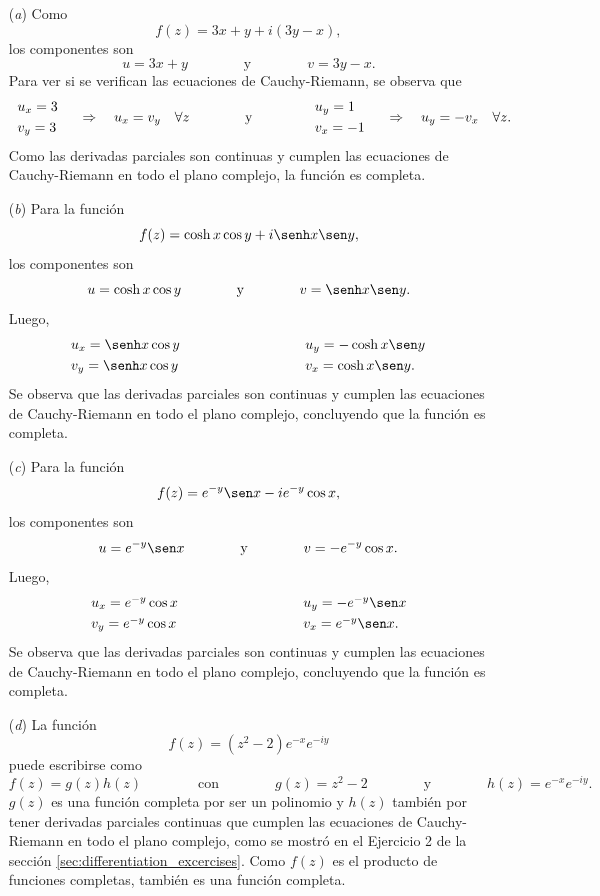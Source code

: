 \documentclass[a4paper]{report}
\begin{document}
\begin{enumerate}
 \item[(\textit{a})] Como
 \[
  f(z)=3x+y+i(3y-x),
 \]
 los componentes son 
 \[
  u=3x+y
  \qquad\qquad\textrm{y}\qquad\qquad
  v=3y-x.
 \]
 Para ver si se verifican las ecuaciones de Cauchy-Riemann, se observa que 
 \[
 \begin{array}{l}
  u_x=3\\[\smallskipamount]
  v_y=3
 \end{array}
 \quad\Rightarrow\quad u_x=v_y\quad\forall z
 \qquad\qquad\textrm{y}\qquad\qquad
 \begin{array}{l}
  u_y=1\\[\smallskipamount]
  v_x=-1
 \end{array}
 \quad\Rightarrow\quad u_y=-v_x\quad\forall z.
 \]
 Como las derivadas parciales son continuas y cumplen las ecuaciones de Cauchy-Riemann en todo el plano complejo, la función es completa.
 \item[(\textit{b})] Para la función
 \[
  f(z)=\cosh x\cos y+i\senh x\sen y,
 \]
 los componentes son 
 \[
  u=\cosh x\cos y
  \qquad\qquad\textrm{y}\qquad\qquad
  v=\senh x\sen y.
 \]
 Luego, 
 \[
 \begin{array}{ll}
  u_x=\senh x\cos y\qquad\qquad\qquad\qquad&u_y=-\cosh x\sen y\\[\smallskipamount]
  v_y=\senh x\cos y\qquad\qquad\qquad\qquad&v_x=\cosh x\sen y.
 \end{array}
 \]
 Se observa que las derivadas parciales son continuas y cumplen las ecuaciones de Cauchy-Riemann en todo el plano complejo, concluyendo que la función es completa. 
 \item[(\textit{c})] Para la función
 \[
  f(z)=e^{-y}\sen x-ie^{-y}\cos x,
 \]
 los componentes son 
 \[
  u=e^{-y}\sen x
  \qquad\qquad\textrm{y}\qquad\qquad
  v=-e^{-y}\cos x.
 \]
 Luego, 
 \[
 \begin{array}{ll}
  u_x=e^{-y}\cos x\qquad\qquad\qquad\qquad&u_y=-e^{-y}\sen x\\[\smallskipamount]
  v_y=e^{-y}\cos x\qquad\qquad\qquad\qquad&v_x=e^{-y}\sen x.
 \end{array}
 \]
 Se observa que las derivadas parciales son continuas y cumplen las ecuaciones de Cauchy-Riemann en todo el plano complejo, concluyendo que la función es completa.
 \item[(\textit{d})] La función
 \[
  f(z)=(z^2-2)e^{-x}e^{-iy}
 \]
 puede escribirse como
 \[
  f(z)=g(z)h(z)
  \qquad\qquad\textrm{con}\qquad\qquad
  g(z)=z^2-2
  \qquad\qquad\textrm{y}\qquad\qquad
  h(z)=e^{-x}e^{-iy}.
 \]
 \(g(z)\) es una función completa por ser un polinomio y \(h(z)\) también por tener derivadas parciales continuas que cumplen las ecuaciones de Cauchy-Riemann en todo el plano complejo, como se mostró en el Ejercicio 2 de la sección \ref{sec:differentiation_excercises}. Como \(f(z)\) es el producto de funciones completas, también es una función completa.
\end{enumerate} 
\end{document}
